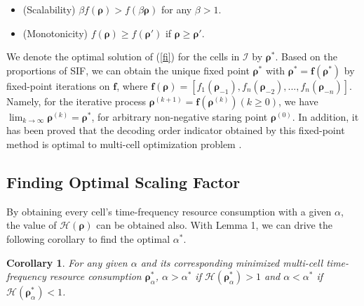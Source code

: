 \documentclass[10pt,journal,final,finalsubmission,twocolumn]{IEEEtran}
\newtheorem{corollary}[theorem]{Corollary}
\begin{document}
\begin{itemize}

\item (Scalability) $\beta f\left(\boldsymbol{\rho}\right)> f\left(\beta\boldsymbol{\rho}\right)$ for any $\beta>1$.

\item (Monotonicity) $f\left(\boldsymbol{\rho}\right) \geq f\left(\boldsymbol{\rho}'\right)$ if $\boldsymbol{\rho} \geq \boldsymbol{\rho}'$.

\end{itemize}

We denote the optimal solution of (\ref{fi}) for the cells in $ \mathcal{I}$ by $\boldsymbol{\rho}^* $. Based on the proportions of SIF, we can obtain the unique fixed point $\boldsymbol{\rho}^*$ with 
$\boldsymbol{\rho}^* = \boldsymbol{f}\left(\boldsymbol{\rho}^*\right)$ by fixed-point iterations on $\boldsymbol{f}$, where $\boldsymbol{f}\left(\boldsymbol{\rho}\right) = \left[ f_1\left(\boldsymbol{\rho}_{-1}\right), f_n\left(\boldsymbol{\rho}_{-2}\right), ..., f_n\left(\boldsymbol{\rho}_{-n}\right)\right]$. Namely, for the iterative process $\boldsymbol{\rho}^{(k+1)} =\boldsymbol{f}\left(\boldsymbol{\rho}^{(k)}\right) (k\geq0)$, we have $\lim_{k\rightarrow \infty }\boldsymbol{\rho}^{(k)}=\boldsymbol{\rho}^*$, for arbitrary non-negative staring point $\boldsymbol{\rho}^{(0)}$. In addition, it has been proved that the decoding order indicator obtained by this fixed-point method is optimal to multi-cell optimization problem \cite[Lemma 3]{You2}.

\subsection{Finding Optimal Scaling Factor}\label{bisection}

 By obtaining every cell's time-frequency resource consumption with a given $\alpha$, the value of $\mathcal{H}(\boldsymbol{\rho})$ can be obtained also. With Lemma 1, we can drive the following corollary to find the optimal $\alpha^*$.

\begin{corollary}\label{canbisection}
For any given $\alpha $ and its corresponding minimized multi-cell time-frequency resource consumption $ \boldsymbol{\rho}^*_\alpha$, $\alpha > \alpha^* $ if $\mathcal{H}(\boldsymbol{\rho}^*_\alpha) > 1$ and $\alpha < \alpha^* $ if $\mathcal{H}(\boldsymbol{\rho}^*_\alpha) < 1$. 
\end{corollary}
\end{document}
